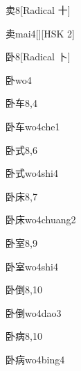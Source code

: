 \begin{entry}{卖}{8}[Radical 十]
  \begin{phonetics}{卖}{mai4}[][HSK 2]
  \end{phonetics}
\end{entry}

\begin{entry}{卧}{8}[Radical 卜]
  \begin{phonetics}{卧}{wo4}
  \end{phonetics}
\end{entry}

\begin{entry}{卧车}{8,4}
  \begin{phonetics}{卧车}{wo4che1}
  \end{phonetics}
\end{entry}

\begin{entry}{卧式}{8,6}
  \begin{phonetics}{卧式}{wo4shi4}
  \end{phonetics}
\end{entry}

\begin{entry}{卧床}{8,7}
  \begin{phonetics}{卧床}{wo4chuang2}
  \end{phonetics}
\end{entry}

\begin{entry}{卧室}{8,9}
  \begin{phonetics}{卧室}{wo4shi4}
  \end{phonetics}
\end{entry}

\begin{entry}{卧倒}{8,10}
  \begin{phonetics}{卧倒}{wo4dao3}
  \end{phonetics}
\end{entry}

\begin{entry}{卧病}{8,10}
  \begin{phonetics}{卧病}{wo4bing4}
  \end{phonetics}
\end{entry}

